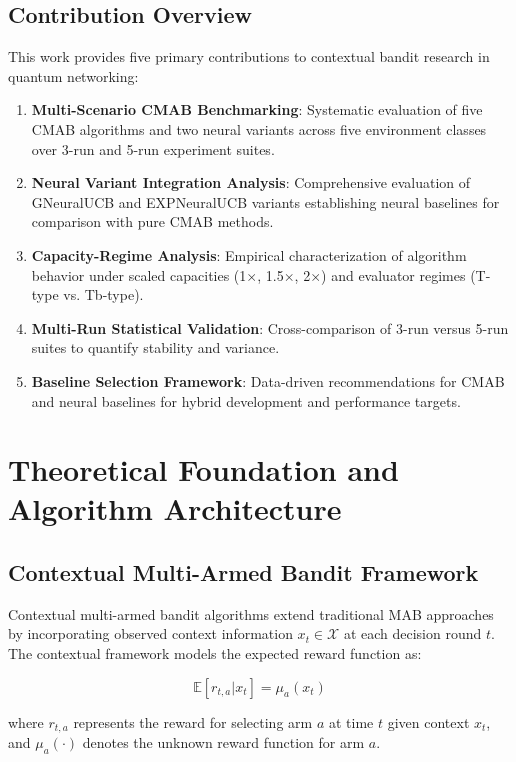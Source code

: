 \documentclass[12pt,a4paper]{article}
\begin{document}
\subsection{Contribution Overview}

This work provides five primary contributions to contextual bandit research in quantum networking:

\begin{enumerate}
\item \textbf{Multi-Scenario CMAB Benchmarking}: Systematic evaluation of five CMAB algorithms and two neural variants across five environment classes over 3-run and 5-run experiment suites.
\item \textbf{Neural Variant Integration Analysis}: Comprehensive evaluation of GNeuralUCB and EXPNeuralUCB variants establishing neural baselines for comparison with pure CMAB methods.
\item \textbf{Capacity-Regime Analysis}: Empirical characterization of algorithm behavior under scaled capacities (1$\times$, 1.5$\times$, 2$\times$) and evaluator regimes (T-type vs. Tb-type).
\item \textbf{Multi-Run Statistical Validation}: Cross-comparison of 3-run versus 5-run suites to quantify stability and variance.
\item \textbf{Baseline Selection Framework}: Data-driven recommendations for CMAB and neural baselines for hybrid development and performance targets.
\end{enumerate}

\newpage
\section{Theoretical Foundation and Algorithm Architecture}

\subsection{Contextual Multi-Armed Bandit Framework}

Contextual multi-armed bandit algorithms extend traditional MAB approaches by incorporating observed context information $x_t \in \mathcal{X}$ at each decision round $t$. The contextual framework models the expected reward function as:

\begin{equation}
\mathbb{E}[r_{t,a} | x_t] = \mu_a(x_t)
\end{equation}

where $r_{t,a}$ represents the reward for selecting arm $a$ at time $t$ given context $x_t$, and $\mu_a(\cdot)$ denotes the unknown reward function for arm $a$.
\end{document}

